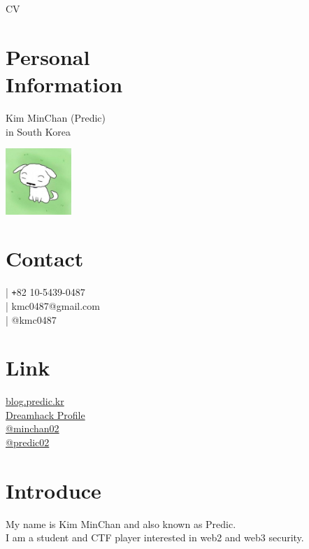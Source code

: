 \documentclass[margin,line]{resume}
\begin{document}
{\sc \Large CV}
\begin{resume}

\begin{minipage}{0.75\textwidth}
  \section{\mysidestyle Personal\\Information}
  Kim MinChan (Predic) \\
  in South Korea
\end{minipage}
\hfill
\begin{minipage}{0.2\textwidth}
  \begin{flushright}
    \includegraphics[width=2.5cm]{profile_image.jpg}
  \end{flushright}
\end{minipage}

    \section{\mysidestyle Contact}
    \faPhone  \space | \texttt{+}82 10-5439-0487 \\
    \faEnvelope  \space | kmc0487@gmail.com \\
     | @kmc0487

    \section{\mysidestyle Link}
    \faLink  \space \href{https://blog.predic.kr}{blog.predic.kr} \\
    \faLink  \space \href{https://dreamhack.io/users/17504}{Dreamhack Profile} \\
    \faGithub  \space \href{https://github.com/minchan02}{@minchan02} \\
    \faTwitter \space \href{https://x.com/predic02}{@predic02} 
   

    \section{\mysidestyle Introduce}
    My name is Kim MinChan and also known as Predic. \\
    I am a student and CTF player interested in web2 and web3 security.
 

\end{resume}
\end{document}
